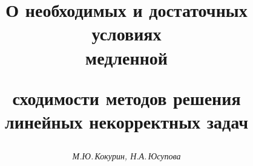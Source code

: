 

 


%


 


\newcommand{\tts}[1]{} 





 




\setcounter{page}{81} 












 


\author{\it М.Ю.\,Кокурин, Н.А.\,Юсупова} 




\title{О необходимых и достаточных условиях\\ медленной  


сходимости методов решения\\ линейных некорректных задач} 


 


\date{} 




\pagestyle{plain} %


 




\maketitle 


